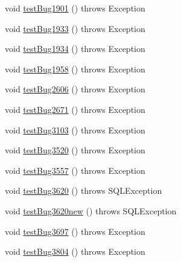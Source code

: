 \begin{DoxyCompactItemize}
\item 
void \mbox{\hyperlink{classtestsuite_1_1regression_1_1_statement_regression_test_aee25d7d22ab4c6ef36bab834d6dacc99}{test\+Bug1901}} ()  throws Exception 
\item 
void \mbox{\hyperlink{classtestsuite_1_1regression_1_1_statement_regression_test_a61d09502580908ecb2e973f8f3f22d51}{test\+Bug1933}} ()  throws Exception 
\item 
void \mbox{\hyperlink{classtestsuite_1_1regression_1_1_statement_regression_test_ae2d0f6ab42a969173a360bf53143ef7d}{test\+Bug1934}} ()  throws Exception 
\item 
void \mbox{\hyperlink{classtestsuite_1_1regression_1_1_statement_regression_test_a83011075c00abbedc8e7d79f2ffb6661}{test\+Bug1958}} ()  throws Exception 
\item 
void \mbox{\hyperlink{classtestsuite_1_1regression_1_1_statement_regression_test_aa53278612006c285096de5d15c6e17aa}{test\+Bug2606}} ()  throws Exception 
\item 
void \mbox{\hyperlink{classtestsuite_1_1regression_1_1_statement_regression_test_a85e39314f65a8b5de7bf5da11ed1fcad}{test\+Bug2671}} ()  throws Exception 
\item 
void \mbox{\hyperlink{classtestsuite_1_1regression_1_1_statement_regression_test_a9c642be3e679b82dbf2a033e2f09e90b}{test\+Bug3103}} ()  throws Exception 
\item 
void \mbox{\hyperlink{classtestsuite_1_1regression_1_1_statement_regression_test_a18dbb1cd4de47766732bd187315d645c}{test\+Bug3520}} ()  throws Exception 
\item 
void \mbox{\hyperlink{classtestsuite_1_1regression_1_1_statement_regression_test_addf4861dd4d40e523b54ffc88ff0e1f9}{test\+Bug3557}} ()  throws Exception 
\item 
void \mbox{\hyperlink{classtestsuite_1_1regression_1_1_statement_regression_test_aff7b0f7e5043e4a16d128d96ad607be6}{test\+Bug3620}} ()  throws S\+Q\+L\+Exception 
\item 
void \mbox{\hyperlink{classtestsuite_1_1regression_1_1_statement_regression_test_a1e239d5a9f63b634b11ab2451ef579eb}{test\+Bug3620new}} ()  throws S\+Q\+L\+Exception 
\item 
void \mbox{\hyperlink{classtestsuite_1_1regression_1_1_statement_regression_test_a2977c93f45f1a9ec78b20348f2d4e290}{test\+Bug3697}} ()  throws Exception 
\item 
void \mbox{\hyperlink{classtestsuite_1_1regression_1_1_statement_regression_test_aa50b1c76440598f989c311efbcc037df}{test\+Bug3804}} ()  throws Exception 

\end{DoxyCompactItemize}
